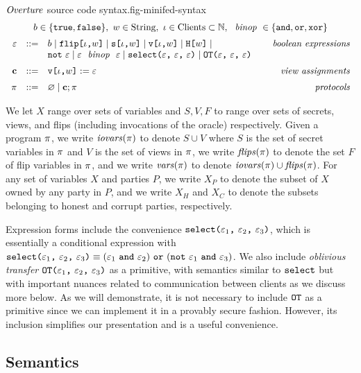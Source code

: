 \begin{fpfig}[t]{$\mathit{Overture}$ source code syntax.}{fig-minifed-syntax}
  {\small
    $$
    \begin{array}{rcl@{\hspace{8mm}}r}
      \multicolumn{4}{c}{b \in \{ \etrue, \efalse \},\  w \in \mathrm{String},\ \cid \in \mathrm{Clients} \subset  \mathbb{N},\ \bop \in \{ \eand, \eor, \exor \}} \\[2mm]
      \be &::=& b \mid \flip{\cid}{w} \mid \secret{\cid}{w} \mid \view{\cid}{w} \mid \oracle{w} \mid & \textit{boolean expressions}\\
      & &  \enot\ \be \mid \be\ \bop\ \be \mid \select{\be}{\be}{\be} \mid \OT{\be}{\be}{\be} \\[2mm]
      \instr &::=& \eassign{\view{\cid}{w}}{\be} & \textit{view assignments} \\[2mm]
      \prog &::=& \varnothing \mid \instr; \prog & \textit{protocols}
    \end{array}
    $$
  }
\end{fpfig}

We let $X$ range over sets of variables and $S,V,F$ to range over sets
of secrets, views, and flips (including invocations of the oracle)
respectively. Given a program $\pi$, we write $\mathit{iovars}(\pi)$ to
denote $S \cup V$ where $S$ is the set of secret variables in $\pi$
and $V$ is the set of views in $\pi$, we write $\mathit{flips}(\pi)$
to denote the set $F$ of flip variables in $\pi$, and we
write $\mathit{vars}(\pi)$ to denote $\mathit{iovars}(\pi) \cup \mathit{flips}(\pi)$. For any set of
variables $X$ and parties $P$, we write $X_P$ to denote the subset of
$X$ owned by any party in $P$, and we write $X_H$ and $X_C$ to denote
the subsets belonging to honest and corrupt parties, respectively.

Expression forms include the convenience
$\texttt{select(} \varepsilon_1 \texttt{,}\ \varepsilon_2 \texttt{,}\ \varepsilon_3 \texttt{)}$, which is essentially a conditional
expression with
$
\select{\be_1}{\be_2}{\be_3} \equiv (\be_1\ \eand\ \be_2)\ \eor\ (\enot\ \be_1\ \eand\ \be_3)
$.
We also include \emph{oblivious transfer} $\texttt{OT(} \varepsilon_1 \texttt{,}\ \varepsilon_2 \texttt{,}\ \varepsilon_3 \texttt{)}$ as a primitive,
with semantics similar to $\texttt{select}$ but with important nuances
related to communication between clients as we discuss more below.
As we will demonstrate, it is not necessary to include $\texttt{OT}$
as a primitive since we can implement it in a provably secure
fashion. However, its inclusion simplifies our presentation and is a useful
convenience.

\subsection{Semantics}

